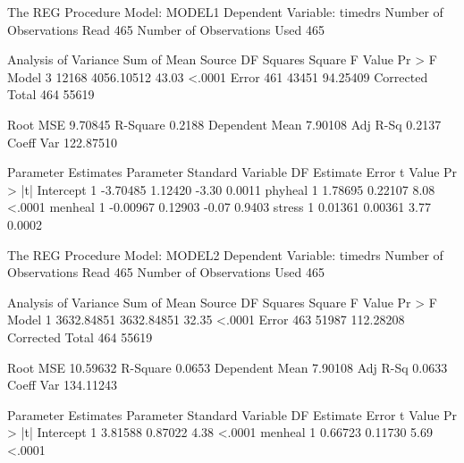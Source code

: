 \documentclass{article}
\begin{document}
\begin{Woutput}
The REG Procedure
Model: MODEL1
Dependent Variable: timedrs
Number of Observations Read         465
Number of Observations Used         465

                        Analysis of Variance
                                Sum of         Mean
Source                 DF      Squares       Square  F Value  Pr > F
Model                   3        12168   4056.10512    43.03  <.0001
Error                 461        43451     94.25409
Corrected Total       464        55619

Root MSE              9.70845    R-Square     0.2188
Dependent Mean        7.90108    Adj R-Sq     0.2137
Coeff Var           122.87510

                        Parameter Estimates
                     Parameter       Standard
Variable     DF       Estimate          Error    t Value    Pr > |t|
Intercept     1       -3.70485        1.12420      -3.30      0.0011
phyheal       1        1.78695        0.22107       8.08      <.0001
menheal       1       -0.00967        0.12903      -0.07      0.9403
stress        1        0.01361        0.00361       3.77      0.0002

The REG Procedure
Model: MODEL2
Dependent Variable: timedrs
Number of Observations Read         465
Number of Observations Used         465

                        Analysis of Variance
                                Sum of         Mean
Source                 DF      Squares       Square  F Value  Pr > F
Model                   1   3632.84851   3632.84851    32.35  <.0001
Error                 463        51987    112.28208
Corrected Total       464        55619

Root MSE             10.59632    R-Square     0.0653
Dependent Mean        7.90108    Adj R-Sq     0.0633
Coeff Var           134.11243

                        Parameter Estimates
                     Parameter       Standard
Variable     DF       Estimate          Error    t Value    Pr > |t|
Intercept     1        3.81588        0.87022       4.38      <.0001
menheal       1        0.66723        0.11730       5.69      <.0001


\end{Woutput}
\end{document}
